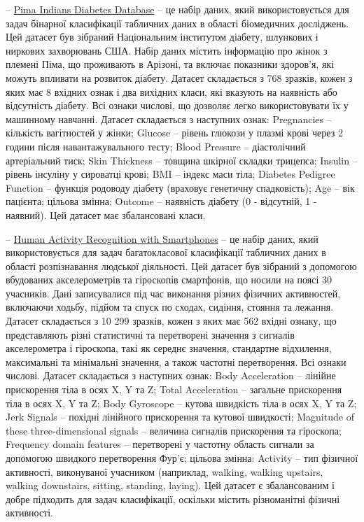 -- \href{https://www.kaggle.com/datasets/uciml/pima-indians-diabetes-database/data}{Pima Indians Diabetes Database} -- це набір даних, який використовується для задач бінарної класифікації табличних даних в області біомедичних досліджень. Цей датасет був зібраний Національним інститутом діабету, шлункових і ниркових захворювань США. Набір даних містить інформацію про жінок з племені Піма, що проживають в Арізоні, та включає показники здоров'я, які можуть впливати на розвиток діабету. Датасет складається з 768 зразків, кожен з яких має 8 вхідних ознак і два вихідних класи, які вказують на наявність або відсутність діабету. Всі ознаки числові, що дозволяє легко використовувати їх у машинному навчанні. Датасет складається з наступних ознак: Pregnancies -- кількість вагітностей у жінки; Glucose -- рівень глюкози у плазмі крові через 2 години після навантажувального тесту; Blood Pressure -- діастолічний артеріальний тиск; Skin Thickness -- товщина шкірної складки трицепса; Insulin -- рівень інсуліну у сироватці крові; BMI -- індекс маси тіла; Diabetes Pedigree Function -- функція родоводу діабету (враховує генетичну спадковість); Age -- вік пацієнта; цільова змінна: Outcome -- наявність діабету (0 - відсутній, 1 - наявний). Цей датасет має збалансовані класи.

-- \href{https://www.kaggle.com/datasets/uciml/human-activity-recognition-with-smartphones/data}{Human Activity Recognition with Smartphones} -- це набір даних, який використовується для задач багатокласової класифікації табличних даних в області розпізнавання людської діяльності. Цей датасет був зібраний з допомогою вбудованих акселерометрів та гіроскопів смартфонів, що носили на поясі 30 учасників. Дані записувалися під час виконання різних фізичних активностей, включаючи ходьбу, підйом та спуск по сходах, сидіння, стояння та лежання. Датасет складається з 10 299 зразків, кожен з яких має 562 вхідні ознаку, що представляють різні статистичні та перетворені значення з сигналів акселерометра і гіроскопа, такі як середнє значення, стандартне відхилення, максимальні та мінімальні значення, а також частотні перетворення. Всі ознаки числові. Датасет складається з наступних ознак: Body Acceleration -- лінійне прискорення тіла в осях X, Y та Z; Total Acceleration -- загальне прискорення тіла в осях X, Y та Z; Body Gyroscope -- кутова швидкість тіла в осях X, Y та Z; Jerk Signals -- похідні лінійного прискорення та кутової швидкості; Magnitude of these three-dimensional signals -- величина сигналів прискорення та гіроскопа; Frequency domain features -- перетворені у частотну область сигнали за допомогою швидкого перетворення Фур'є; цільова змінна: Activity -- тип фізичної активності, виконуваної учасником (наприклад, walking, walking upstairs, walking downstairs, sitting, standing, laying). Цей датасет є збалансованим і добре підходить для задач класифікації, оскільки містить різноманітні фізичні активності.

